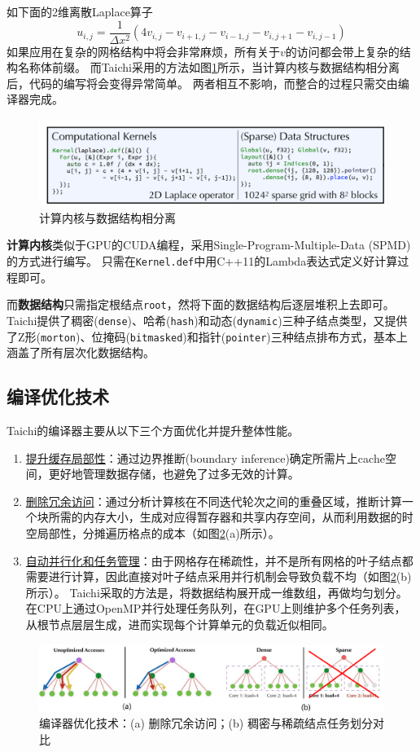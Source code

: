 \documentclass[thesis]{thesis}
\begin{document}
如下面的2维离散Laplace算子
\begin{equation}
u_{i,j}=\frac{1}{\Delta x^2}(4v_{i,j}-v_{i+1,j}-v_{i-1,j}-v_{i,j+1}-v_{i,j-1})
\end{equation}
如果应用在复杂的网格结构中将会非常麻烦，所有关于$v$的访问都会带上复杂的结构名称体前缀。
而Taichi采用的方法如图\ref{fig:decouple}所示，当计算内核与数据结构相分离后，代码的编写将会变得异常简单。
两者相互不影响，而整合的过程只需交由编译器完成。
\begin{figure}[htbp]
\centering
\includegraphics[width=0.6\linewidth]{fig/decouple.png}
\caption{计算内核与数据结构相分离}
\label{fig:decouple}
\end{figure}

\textbf{计算内核}类似于GPU的CUDA编程，采用Single-Program-Multiple-Data (SPMD)的方式进行编写。
只需在\verb'Kernel.def'中用C++11的Lambda表达式定义好计算过程即可。

而\textbf{数据结构}只需指定根结点\verb'root'，然将下面的数据结构后逐层堆积上去即可。
Taichi提供了稠密(\verb'dense')、哈希(\verb'hash')和动态(\verb'dynamic')三种子结点类型，又提供了Z形(\verb'morton')、位掩码(\verb'bitmasked')和指针(\verb'pointer')三种结点排布方式，基本上涵盖了所有层次化数据结构。

\subsection{编译优化技术}
Taichi的编译器主要从以下三个方面优化并提升整体性能。
\begin{enumerate}
	\item [1)] \underline{提升缓存局部性}：通过边界推断(boundary inference)确定所需片上cache空间，更好地管理数据存储，也避免了过多无效的计算。
	\item [2)] \underline{删除冗余访问}：通过分析计算核在不同迭代轮次之间的重叠区域，推断计算一个块所需的内存大小，生成对应得暂存器和共享内存空间，从而利用数据的时空局部性，分摊遍历格点的成本（如图\ref{fig:opt}(a)所示）。
	\item [3)] \underline{自动并行化和任务管理}：由于网格存在稀疏性，并不是所有网格的叶子结点都需要进行计算，因此直接对叶子结点采用并行机制会导致负载不均（如图\ref{fig:opt}(b)所示）。
	Taichi采取的方法是，将数据结构展开成一维数组，再做均匀划分。
	在CPU上通过OpenMP并行处理任务队列，在GPU上则维护多个任务列表，从根节点层层生成，进而实现每个计算单元的负载近似相同。 
\end{enumerate}
\begin{figure}[htbp]
\centering
\includegraphics[width=\linewidth]{fig/opt.png}
\caption{编译器优化技术：(a) 删除冗余访问；(b) 稠密与稀疏结点任务划分对比}
\label{fig:opt}
\end{figure}
\end{document}

